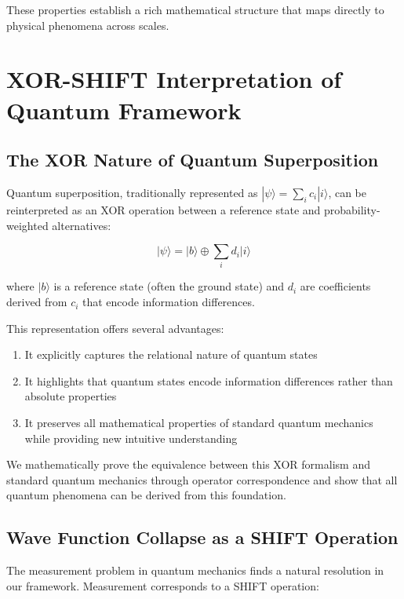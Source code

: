 \documentclass[aps,prl,preprint,superscriptaddress,showpacs]{revtex4-2}
\newcommand{\xor}{\oplus}
\begin{document}
These properties establish a rich mathematical structure that maps directly to physical phenomena across scales.

\section{XOR-SHIFT Interpretation of Quantum Framework}

\subsection{The XOR Nature of Quantum Superposition}

Quantum superposition, traditionally represented as $|\psi\rangle = \sum_i c_i |i\rangle$, can be reinterpreted as an XOR operation between a reference state and probability-weighted alternatives:

\begin{equation}
|\psi\rangle = |b\rangle \xor \sum_i d_i |i\rangle
\end{equation}

where $|b\rangle$ is a reference state (often the ground state) and $d_i$ are coefficients derived from $c_i$ that encode information differences.

This representation offers several advantages:

\begin{enumerate}
\item It explicitly captures the relational nature of quantum states
\item It highlights that quantum states encode information differences rather than absolute properties
\item It preserves all mathematical properties of standard quantum mechanics while providing new intuitive understanding
\end{enumerate}

We mathematically prove the equivalence between this XOR formalism and standard quantum mechanics through operator correspondence and show that all quantum phenomena can be derived from this foundation.

\subsection{Wave Function Collapse as a SHIFT Operation}

The measurement problem in quantum mechanics finds a natural resolution in our framework. Measurement corresponds to a SHIFT operation:
\end{document}
